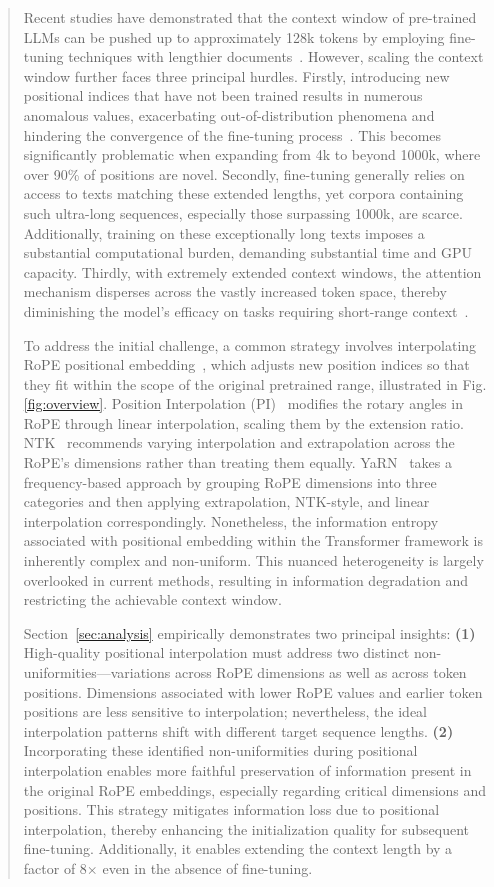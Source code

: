 \begin{abstract}
Recent studies have demonstrated that the context window of pre-trained LLMs can be pushed up to approximately 128k tokens by employing fine-tuning techniques with lengthier documents~\cite{longlora,pi,yarn,zhang2024soaring,liu2023scaling}. However, scaling the context window further faces three principal hurdles. Firstly, introducing new positional indices that have not been trained results in numerous anomalous values, exacerbating out-of-distribution phenomena and hindering the convergence of the fine-tuning process~\cite{pi}. This becomes significantly problematic when expanding from 4k to beyond 1000k, where over 90\% of positions are novel. Secondly, fine-tuning generally relies on access to texts matching these extended lengths, yet corpora containing such ultra-long sequences, especially those surpassing 1000k, are scarce. Additionally, training on these exceptionally long texts imposes a substantial computational burden, demanding substantial time and GPU capacity. Thirdly, with extremely extended context windows, the attention mechanism disperses across the vastly increased token space, thereby diminishing the model's efficacy on tasks requiring short-range context~\cite{pi}.

To address the initial challenge, a common strategy involves interpolating RoPE positional embedding~\cite{rope,pi}, which adjusts new position indices so that they fit within the scope of the original pretrained range, illustrated in Fig.\ref{fig:overview}. Position Interpolation (PI)~\cite{pi} modifies the rotary angles in RoPE through linear interpolation, scaling them by the extension ratio. NTK~\cite{ntk,dynamicntk} recommends varying interpolation and extrapolation across the RoPE's dimensions rather than treating them equally. YaRN~\cite{yarn} takes a frequency-based approach by grouping RoPE dimensions into three categories and then applying extrapolation, NTK-style, and linear interpolation correspondingly. Nonetheless, the information entropy associated with positional embedding within the Transformer framework is inherently complex and non-uniform. This nuanced heterogeneity is largely overlooked in current methods, resulting in information degradation and restricting the achievable context window.

Section~\ref{sec:analysis} empirically demonstrates two principal insights: \textbf{(1)} High-quality positional interpolation must address two distinct non-uniformities—variations across RoPE dimensions as well as across token positions. Dimensions associated with lower RoPE values and earlier token positions are less sensitive to interpolation; nevertheless, the ideal interpolation patterns shift with different target sequence lengths. 
\textbf{(2)} Incorporating these identified non-uniformities during positional interpolation enables more faithful preservation of information present in the original RoPE embeddings, especially regarding critical dimensions and positions. This strategy mitigates information loss due to positional interpolation, thereby enhancing the initialization quality for subsequent fine-tuning. Additionally, it enables extending the context length by a factor of 8$\times$ even in the absence of fine-tuning.


\end{abstract}
